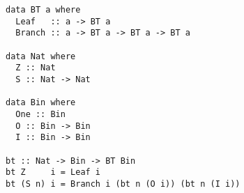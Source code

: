\documentclass[acmsmall,review]{acmart}\settopmatter{printfolios=true,printccs=false,printacmref=false}
\begin{document}
\begin{verbatim}
data BT a where
  Leaf   :: a -> BT a
  Branch :: a -> BT a -> BT a -> BT a

data Nat where
  Z :: Nat
  S :: Nat -> Nat

data Bin where
  One :: Bin
  O :: Bin -> Bin
  I :: Bin -> Bin

bt :: Nat -> Bin -> BT Bin
bt Z     i = Leaf i
bt (S n) i = Branch i (bt n (O i)) (bt n (I i))
\end{verbatim}

\begin{acks}                            %
\end{acks}






\end{document}
